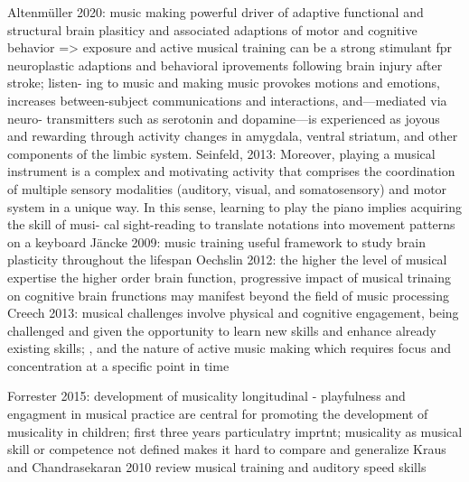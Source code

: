 Altenmüller 2020: music making powerful driver of adaptive functional and structural brain plasiticy and associated adaptions of motor and cognitive behavior => exposure and active musical training can be a strong stimulant fpr neuroplastic adaptions and behavioral iprovements following brain injury after stroke; listen- ing to music and making music provokes motions and emotions, increases between-subject communications and interactions, and—mediated via neuro- transmitters such as serotonin and dopamine—is experienced as joyous and rewarding through activity changes in amygdala, ventral striatum, and other components of the limbic system.
Seinfeld, 2013: Moreover, playing a musical instrument is a complex and motivating activity that comprises the coordination of multiple sensory modalities (auditory, visual, and somatosensory) and motor system in a unique way. In this sense, learning to play the piano implies acquiring the skill of musi- cal sight-reading to translate notations into movement patterns on a keyboard
Jäncke 2009: music training useful framework to study brain plasticity throughout the lifespan
Oechslin 2012: the higher the level of musical expertise the higher order brain function, progressive impact of musical trinaing on cognitive brain frunctions may manifest beyond the field of music processing
Creech 2013: musical challenges involve physical and cognitive engagement, being challenged and given the opportunity to learn new skills and enhance already existing skills; , and the nature of active music making which requires focus and concentration at a specific point in time 

Forrester 2015: development of musicality longitudinal - playfulness and engagment in musical practice are central for promoting the development of musicality in children; first three years particulatry imprtnt; musicality as musical skill or competence not defined makes it hard to compare and generalize
Kraus and Chandrasekaran 2010 review musical training and auditory speed skills 


